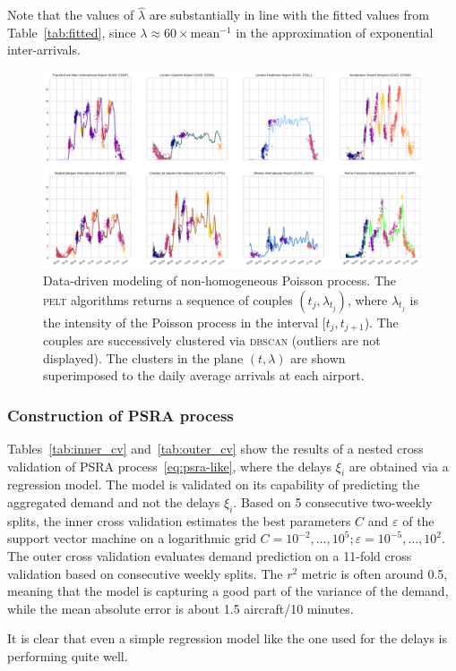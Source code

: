 \documentclass[]{elsarticle}
\newcommand{\PELT}{\textsc{pelt}}
\newcommand{\DBSCAN}{\textsc{dbscan}}
\begin{document}
\begin{rmk}
	Note that the values of \(\hat{\lambda}\) are substantially in line with the fitted values from Table~\ref{tab:fitted}, since \(\lambda \approx 60 \times \text{mean}^{-1}\) in the approximation of exponential inter-arrivals.
\end{rmk}

\begin{figure}
    \includegraphics[width=\textwidth]{DDPoisson}
    \caption{Data-driven modeling of non-homogeneous Poisson process. The \PELT{} algorithms returns a sequence of couples \((t_j,\lambda_{t_j})\), where \(\lambda_{t_j}\) is the intensity of the Poisson process in the interval \([t_j, t_{j+1}\)). The couples are successively clustered via \DBSCAN{} (outliers are not displayed). The clusters in the plane \((t,\lambda)\) are shown superimposed to the daily average arrivals at each airport.}\label{fig:poisson_segmentation}
\end{figure}

\subsubsection{Construction of \acs{PSRA} process}\label{sec:psra}

Tables~\ref{tab:inner_cv} and~\ref{tab:outer_cv} show the results of a nested cross validation of \ac{PSRA} process~\eqref{eq:psra-like}, where the delays \(\xi_i\) are obtained via a regression model.
The model is validated on its capability of predicting the aggregated demand and not the delays \(\xi_i\).
Based on 5 consecutive two-weekly splits, the inner cross validation estimates the best parameters \(C\) and \(\varepsilon\) of the support vector machine on a logarithmic grid \(C = 10^{-2},\ldots, 10^5; \varepsilon = 10^{-5},\dots,10^2\).
The outer cross validation evaluates demand prediction on a 11-fold cross validation based on consecutive weekly splits.
The \(r^2\) metric is often around 0.5, meaning that the model is capturing a good part of the variance of the demand, while the mean absolute error is about 1.5 aircraft/10 minutes.
\begin{kpt}
  It is clear that even a simple regression model like the one used for the delays is performing quite well.
\end{kpt}
\end{document}
